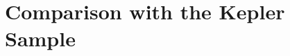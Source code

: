 \documentclass{emulateapj}
\begin{document}
%
%


\section{Comparison with the Kepler Sample}
\end{document}
